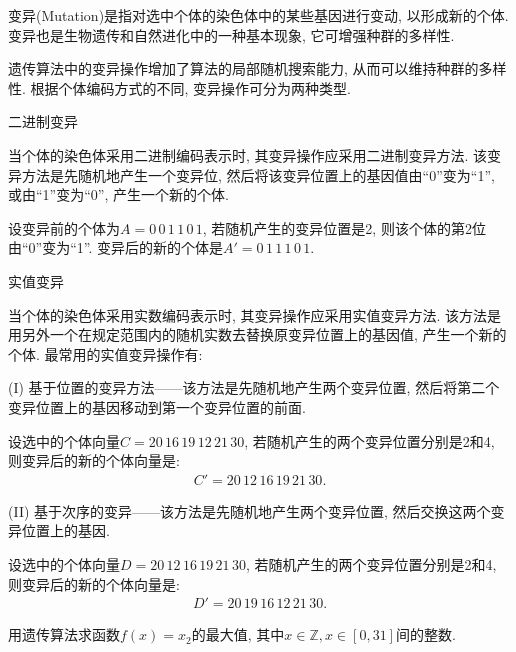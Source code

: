  变异(Mutation)是指对选中个体的染色体中的某些基因进行变动, 以形成新的个体.
 变异也是生物遗传和自然进化中的一种基本现象, 它可增强种群的多样性.

 遗传算法中的变异操作增加了算法的局部随机搜索能力, 从而可以维持种群的多样性. 根据个体编码方式的不同, 变异操作可分为两种类型.

  二进制变异

 当个体的染色体采用二进制编码表示时, 其变异操作应采用二进制变异方法. 该变异方法是先随机地产生一个变异位, 然后将该变异位置上的基因值由“0”变为“1”, 或由“1”变为“0”, 产生一个新的个体.

\begin{example}
设变异前的个体为$A=0\, 0 \, 1\,  1\,  0 \, 1$, 若随机产生的变异位置是2, 则该个体的第2位由“0”变为“1”.
变异后的新的个体是$A'= 0\,  1\,  1\,  1\,  0 \, 1$.
\end{example}

 实值变异

 当个体的染色体采用实数编码表示时, 其变异操作应采用实值变异方法. 该方法是用另外一个在规定范围内的随机实数去替换原变异位置上的基因值, 产生一个新的个体. 最常用的实值变异操作有:

(I) 基于位置的变异方法——该方法是先随机地产生两个变异位置, 然后将第二个变异位置上的基因移动到第一个变异位置的前面.

\begin{example}
设选中的个体向量$C=20\,  16\,  19\,  12\,  21\,  30$, 若随机产生的两个变异位置分别是2和4, 则变异后的新的个体向量是:
\begin{align*}
    C'= 20\,  12 \, 16 \, 19\,  21\,  30.
\end{align*}
\vspace{-0.4cm}
\end{example}

(II) 基于次序的变异——该方法是先随机地产生两个变异位置, 然后交换这两个变异位置上的基因.

\begin{example}
    设选中的个体向量$D=20\,  12 \, 16 \, 19\,  21\,  30$, 若随机产生的两个变异位置分别是2和4, 则变异后的新的个体向量是:
\begin{align*}
    D'= 20\,  19\,  16\,  12 \, 21 \, 30.
\end{align*}
\vspace{-0.4cm}
\end{example}

\begin{example}
    用遗传算法求函数$f(x)=x_2$的最大值, 其中$x\in \mathbb Z, x\in [0,31]$间的整数.
\end{example}

